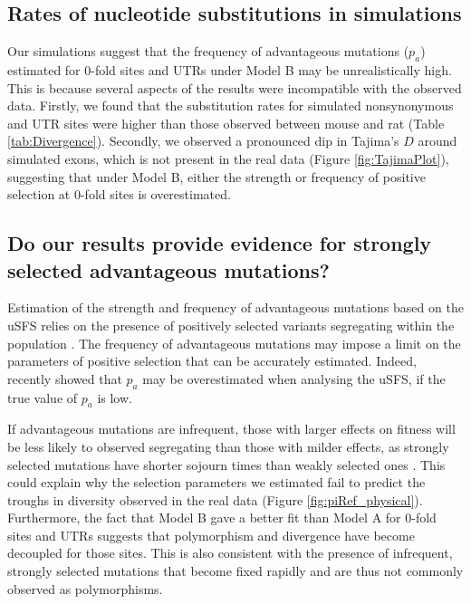 \subsection{Rates of nucleotide substitutions in simulations}

	Our simulations suggest that the frequency of advantageous mutations ($p_a$) estimated for 0-fold sites and UTRs under Model B may be unrealistically high. This is because several aspects of the results were incompatible with the observed data. Firstly, we found that the substitution rates for simulated nonsynonymous and UTR sites were higher than those observed between mouse and rat (Table \ref{tab:Divergence}). Secondly, we observed a pronounced dip in Tajima's $D$ around simulated exons, which is not present in the real data (Figure \ref{fig:TajimaPlot}), suggesting that under Model B, either the strength or frequency of positive selection at 0-fold sites is overestimated. 

\subsection{Do our results provide evidence for strongly selected advantageous mutations?}

	Estimation of the strength and frequency of advantageous mutations based on the uSFS relies on the presence of positively selected variants segregating within the population \citep{RN201, RN210, RN354}. The frequency of advantageous mutations may impose a limit on the parameters of positive selection that can be accurately estimated. Indeed, \cite{RN354} recently showed that $p_a$ may be overestimated when analysing the uSFS, if the true value of $p_a$ is low. 

	If advantageous mutations are infrequent, those with larger effects on fitness will be less likely to observed segregating than those with milder effects, as strongly selected mutations have shorter sojourn times than weakly selected ones \citep{RN400,RN401}. This could explain why the selection parameters we estimated fail to predict the troughs in diversity observed in the real data (Figure \ref{fig:piRef_physical}). Furthermore, the fact that Model B gave a better fit than Model A for 0-fold sites and UTRs suggests that polymorphism and divergence have become decoupled for those sites. This is also consistent with the presence of infrequent, strongly selected mutations that become fixed rapidly and are thus not commonly observed as polymorphisms.

